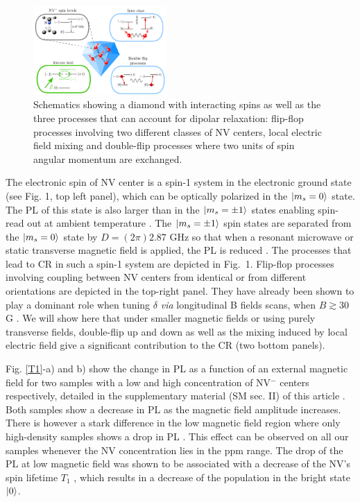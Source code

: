 \documentclass[preprintnumbers,amsmath,amssymb,superscriptaddress,twocolumn,showpacs]{revtex4-2}
\begin{document}
\begin{figure}
\includegraphics[width=0.45\textwidth]{shema_summary.pdf}
\caption{Schematics showing a diamond with interacting spins as well as the three processes that can account for dipolar relaxation: flip-flop processes involving two different classes of NV centers, local electric field mixing and double-flip processes where two units of spin angular momentum are exchanged. }
\label{schema_intro}
\end{figure}

The electronic spin of NV center is a spin-1 system in the electronic ground state (see Fig. 1, top left panel), which can be optically polarized in the $\ket{m_s=0}$ state. The PL of this state is also larger than in the $\ket{m_s=\pm 1}$ states enabling spin-read out at ambient temperature \cite{DOHERTY20131}. The $\ket{m_s=\pm 1}$ spin states are separated from the $\ket{m_s=0}$ state by  $D = (2\pi) 2.87$ GHz so that when a resonant microwave or static transverse magnetic field is applied, the PL is reduced \citep{epstein2005anisotropic,lai2009influence}.  The processes that lead to CR in such a spin-1 system are depicted in Fig.~1. Flip-flop processes involving coupling between NV centers from identical or from different orientations are depicted in the top-right panel. They have already been shown to play a dominant role when tuning $\delta$ {\it via} longitudinal B fields scans, when $B \gtrsim 30$G \cite{choi_observation_2017}. We will show here that under smaller magnetic fields or using purely transverse fields, double-flip up and down as well as the mixing induced by local electric field give a significant contribution to the CR (two bottom panels). 

Fig.  \ref{T1}-a) and b) show the change in PL as a function of an external magnetic field for two samples with a low and high concentration of NV$^-$ centers respectively, detailed in the supplementary material (SM sec. II) of this article \citep{SI_low_filed_CR} \nocite{anishchik2015low, filimonenko2020weak, van1990electric}. Both samples show a decrease in PL as the magnetic field amplitude increases.  There is however a stark difference in the low magnetic field region where only high-density samples shows a drop in PL \citep{jarmola_longitudinal_2015,  mrozek_longitudinal_2015}. This effect can be observed on all our samples whenever the NV concentration lies in the ppm range. The drop of the PL at low magnetic field was shown to be associated with a decrease of the NV's spin lifetime $T_1$ \citep{jarmola_temperature-_2012}, which results in a decrease of the population in the bright state $\ket{0}$.
\end{document}

